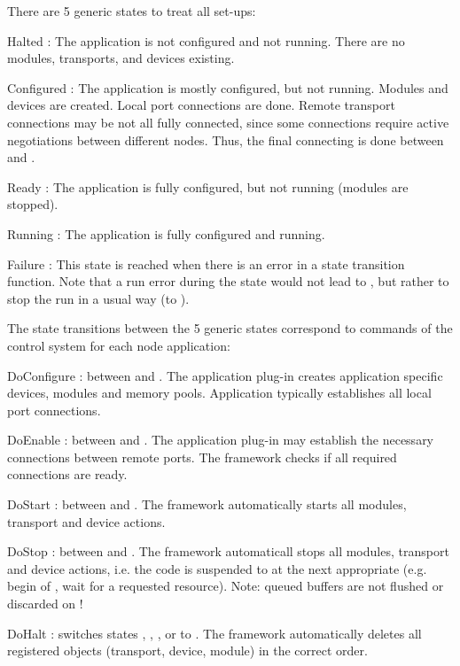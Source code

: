 There are 5 generic states to treat all set-ups: 
\begin{compactdesc}
\item[Halted] : The application is not configured and not running. 
	 There are no modules, transports, and devices existing.
\item[Configured] : The application is mostly configured, but not running. 
	 Modules and devices are created. Local port connections are done.
	  Remote transport connections may be not all fully connected, 
	  since some connections require active negotiations between different nodes. 
	  Thus, the final connecting is done between 
	   and .  
\item[Ready] : The application is fully configured, but not running 
	 (modules are stopped).
\item[Running] : The application is fully configured and running.
\item[Failure] : This state is reached when there is an error in a 
	 state transition function. Note that a run error during the 
	  state would not lead to , but rather to stop 
	 the run in a usual way (to ).
\end{compactdesc}

The state transitions between the 5 generic states correspond to 
      commands of the control system for each node application:
\begin{compactdesc}
\item[DoConfigure] : between  and . 
    The application plug-in creates application 
	 specific devices, modules and memory pools. Application typically establishes all 
	 local port connections. 
\item[DoEnable] : between  and . 
	 The application plug-in may establish the necessary 
	 connections between remote ports. The framework checks if 
	 all required connections are ready.
\item[DoStart]  : between  and . The framework automatically 
	 starts all modules, transport and device actions.
\item[DoStop] : between  and . The framework automaticall 
	 stops all modules, transport and device actions, 
	 i.e. the code is suspended to  at the next appropriate 
	  (e.g. begin of , wait for a requested resource). 
	 Note: queued buffers are not flushed or discarded on  !
\item[DoHalt] : switches states  ,  , , or 
	  to . The framework automatically deletes all 
	 registered objects (transport, device, module) 
	 in the correct order. 
\end{compactdesc}

